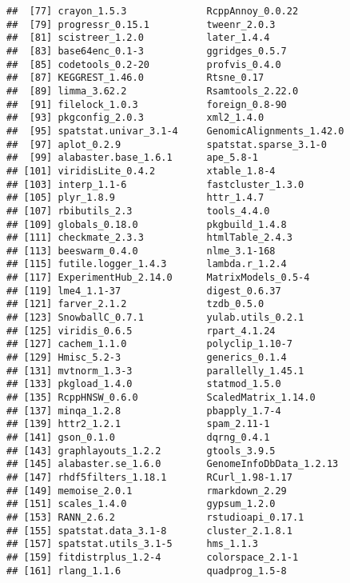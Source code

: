 \documentclass[
  11pt,
  a4paper,
]{article}
\begin{document}
\begin{verbatim}
##  [77] crayon_1.5.3              RcppAnnoy_0.0.22         
##  [79] progressr_0.15.1          tweenr_2.0.3             
##  [81] scistreer_1.2.0           later_1.4.4              
##  [83] base64enc_0.1-3           ggridges_0.5.7           
##  [85] codetools_0.2-20          profvis_0.4.0            
##  [87] KEGGREST_1.46.0           Rtsne_0.17               
##  [89] limma_3.62.2              Rsamtools_2.22.0         
##  [91] filelock_1.0.3            foreign_0.8-90           
##  [93] pkgconfig_2.0.3           xml2_1.4.0               
##  [95] spatstat.univar_3.1-4     GenomicAlignments_1.42.0 
##  [97] aplot_0.2.9               spatstat.sparse_3.1-0    
##  [99] alabaster.base_1.6.1      ape_5.8-1                
## [101] viridisLite_0.4.2         xtable_1.8-4             
## [103] interp_1.1-6              fastcluster_1.3.0        
## [105] plyr_1.8.9                httr_1.4.7               
## [107] rbibutils_2.3             tools_4.4.0              
## [109] globals_0.18.0            pkgbuild_1.4.8           
## [111] checkmate_2.3.3           htmlTable_2.4.3          
## [113] beeswarm_0.4.0            nlme_3.1-168             
## [115] futile.logger_1.4.3       lambda.r_1.2.4           
## [117] ExperimentHub_2.14.0      MatrixModels_0.5-4       
## [119] lme4_1.1-37               digest_0.6.37            
## [121] farver_2.1.2              tzdb_0.5.0               
## [123] SnowballC_0.7.1           yulab.utils_0.2.1        
## [125] viridis_0.6.5             rpart_4.1.24             
## [127] cachem_1.1.0              polyclip_1.10-7          
## [129] Hmisc_5.2-3               generics_0.1.4           
## [131] mvtnorm_1.3-3             parallelly_1.45.1        
## [133] pkgload_1.4.0             statmod_1.5.0            
## [135] RcppHNSW_0.6.0            ScaledMatrix_1.14.0      
## [137] minqa_1.2.8               pbapply_1.7-4            
## [139] httr2_1.2.1               spam_2.11-1              
## [141] gson_0.1.0                dqrng_0.4.1              
## [143] graphlayouts_1.2.2        gtools_3.9.5             
## [145] alabaster.se_1.6.0        GenomeInfoDbData_1.2.13  
## [147] rhdf5filters_1.18.1       RCurl_1.98-1.17          
## [149] memoise_2.0.1             rmarkdown_2.29           
## [151] scales_1.4.0              gypsum_1.2.0             
## [153] RANN_2.6.2                rstudioapi_0.17.1        
## [155] spatstat.data_3.1-8       cluster_2.1.8.1          
## [157] spatstat.utils_3.1-5      hms_1.1.3                
## [159] fitdistrplus_1.2-4        colorspace_2.1-1         
## [161] rlang_1.1.6               quadprog_1.5-8           

\end{verbatim}
\end{document}
